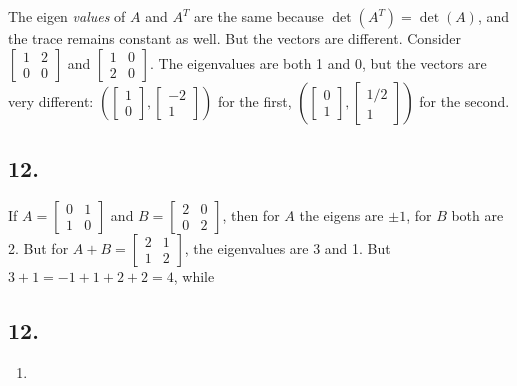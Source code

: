 \documentclass[
]{article}
\providecommand{\tightlist}{%
  \setlength{\itemsep}{0pt}\setlength{\parskip}{0pt}}
\begin{document}
The eigen \emph{values} of \(A\) and \(A^T\) are the same because
\(\det(A^T) = \det(A)\), and the trace remains constant as well. But the
vectors are different. Consider
\(\begin{bmatrix}1 &2\\0 & 0\end{bmatrix}\) and
\(\begin{bmatrix}1& 0\\ 2& 0\end{bmatrix}\). The eigenvalues are both 1
and 0, but the vectors are very different:
\((\begin{bmatrix}1\\0\end{bmatrix}, \begin{bmatrix}-2\\1\end{bmatrix})\)
for the first,
\((\begin{bmatrix}0\\1\end{bmatrix}, \begin{bmatrix}1/2\\1\end{bmatrix})\)
for the second.

\hypertarget{section-9}{%
\subsection{12.}\label{section-9}}

If \(A = \begin{bmatrix}0 & 1\\ 1 & 0\end{bmatrix}\) and
\(B = \begin{bmatrix}2 & 0\\0 &2\end{bmatrix}\), then for \(A\) the
eigens are \(\pm1\), for \(B\) both are 2. But for
\(A + B = \begin{bmatrix}2 & 1\\ 1 & 2\end{bmatrix}\), the eigenvalues
are 3 and 1. But \(3 +1 = -1 + 1 + 2 + 2 = 4\), while

\hypertarget{section-10}{%
\subsection{12.}\label{section-10}}

\begin{enumerate}
\def\labelenumi{\alph{enumi}.}
\tightlist
\item
\end{enumerate}
\end{document}
